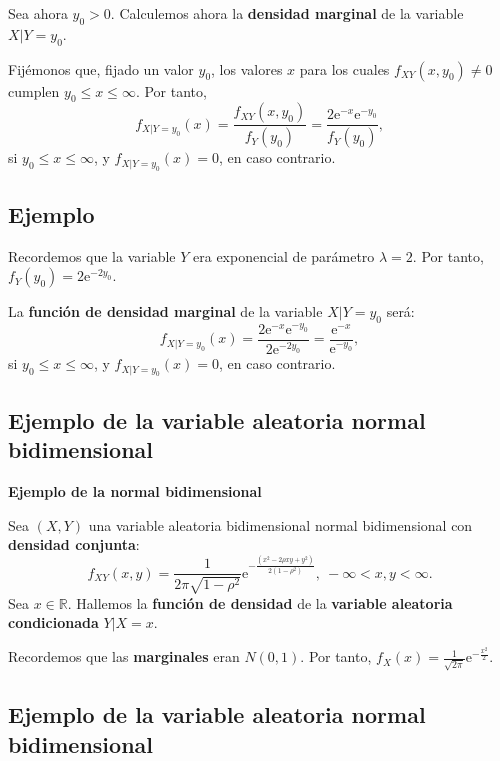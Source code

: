 \documentclass[]{book}
\begin{document}
Sea ahora \(y_0>0\). Calculemos ahora la \textbf{densidad marginal} de la variable \(X|Y=y_0\).

Fijémonos que, fijado un valor \(y_0\), los valores \(x\) para los cuales \(f_{XY}(x,y_0)\neq 0\) cumplen \(y_0\leq x\leq \infty\). Por tanto,
\[
f_{X|Y=y_0}(x)=\frac{f_{XY}(x,y_0)}{f_Y(y_0)}=\frac{2\mathrm{e}^{-x}\mathrm{e}^{-y_0}}{f_Y(y_0)},
\]
si \(y_0\leq x\leq \infty\), y \(f_{X|Y=y_0}(x)=0\), en caso contrario.

\hypertarget{ejemplo-69}{%
\subsection{Ejemplo}\label{ejemplo-69}}

Recordemos que la variable \(Y\) era exponencial de parámetro \(\lambda=2\). Por tanto, \(f_Y(y_0)=2\mathrm{e}^{-2y_0}\).

La \textbf{función de densidad marginal} de la variable \(X|Y=y_0\) será:
\[
f_{X|Y=y_0}(x)=\frac{2\mathrm{e}^{-x}\mathrm{e}^{-y_0}}{2\mathrm{e}^{-2y_0}}=\frac{\mathrm{e}^{-x}}{\mathrm{e}^{-y_0}},
\]
si \(y_0\leq x\leq \infty\), y \(f_{X|Y=y_0}(x)=0\), en caso contrario.

\hypertarget{ejemplo-de-la-variable-aleatoria-normal-bidimensional}{%
\subsection{Ejemplo de la variable aleatoria normal bidimensional}\label{ejemplo-de-la-variable-aleatoria-normal-bidimensional}}

\textbf{Ejemplo de la normal bidimensional}

Sea \((X,Y)\) una variable aleatoria bidimensional normal bidimensional con \textbf{densidad conjunta}:
\[
f_{XY}(x,y)=\frac{1}{2\pi\sqrt{1-\rho^2}}\mathrm{e}^{-\frac{(x^2-2\rho xy+y^2)}{2(1-\rho^2)}},\ -\infty <x,y<\infty.
\]
Sea \(x\in\mathbb{R}\). Hallemos la \textbf{función de densidad} de la \textbf{variable aleatoria condicionada} \(Y|X=x\).

Recordemos que las \textbf{marginales} eran \(N(0,1)\). Por tanto, \(f_X(x)=\frac{1}{\sqrt{2\pi}}\mathrm{e}^{-\frac{x^2}{2}}.\)

\hypertarget{ejemplo-de-la-variable-aleatoria-normal-bidimensional-1}{%
\subsection{Ejemplo de la variable aleatoria normal bidimensional}\label{ejemplo-de-la-variable-aleatoria-normal-bidimensional-1}}
\end{document}
